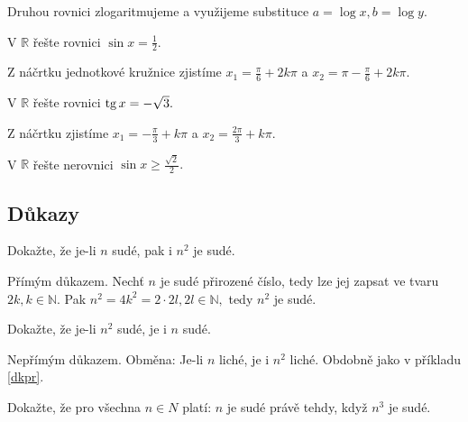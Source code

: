 \begin{reseni}
Druhou rovnici zlogaritmujeme a využijeme substituce $a=\log x, b=\log y.$
\end{reseni}

\begin{priklad}
V $\mathbb R$ řešte rovnici $\sin x = \frac{1}{2}.$
\end{priklad}

\begin{reseni}
Z náčrtku jednotkové kružnice zjistíme $x_1 = \frac{\pi}{6}+2k\pi$ a $x_2=\pi-\frac{\pi}{6}+2k\pi.$
\end{reseni}

\begin{priklad}
V $\mathbb R$ řešte rovnici $\operatorname{tg} x = -\sqrt{3}. $
\end{priklad}

\begin{reseni}
Z náčrtku zjistíme $x_1=-\frac{\pi}{3}+k\pi$ a $x_2=\frac{2\pi}{3}+k\pi.$
\end{reseni}

\begin{priklad}
V $\mathbb R$ řešte nerovnici $\sin x \geq \frac{\sqrt{2} }{2}.$
\end{priklad}


\subsection{Důkazy}
\begin{priklad}
Dokažte, že je-li $n$ sudé, pak i $n^2$ je sudé.
\end{priklad}

\begin{reseni}\label{dkpr}
Přímým důkazem. Nechť $n$ je sudé přirozené číslo, tedy lze jej zapsat ve tvaru $2k, k \in \mathbb N.$
Pak $n^2 = 4k^2 = 2\cdot 2l, 2l\in \mathbb N, $ tedy $n^2$ je sudé.
\end{reseni}

\begin{priklad}
Dokažte, že je-li $n^2$ sudé, je i $n$ sudé.
\end{priklad}

\begin{reseni}
Nepřímým důkazem. Obměna: Je-li $n$ liché, je i $n^2$ liché. Obdobně jako v příkladu \ref{dkpr}.
\end{reseni}

\begin{priklad}
Dokažte, že pro všechna $n\in N$ platí: $n$ je sudé právě tehdy, když $n^3$ je sudé.
\end{priklad}

